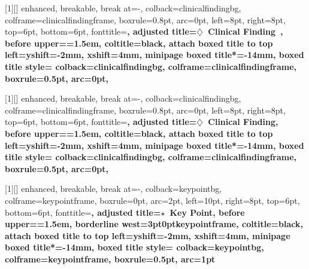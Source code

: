 \newcommand{\clinicalfindingicon}{\ensuremath{\diamondsuit}}

[1][]{%
  enhanced,
  breakable,
  break at=-\baselineskip,
  colback=clinicalfindingbg,
  colframe=clinicalfindingframe,
  boxrule=0.8pt,
  arc=0pt,
  left=8pt,
  right=8pt,
  top=6pt,
  bottom=6pt,
  fonttitle=\bfseries\sffamily,
  adjusted title={\clinicalfindingicon~Clinical Finding~\theclinicalfindingcounter{}},
  before upper={\parindent=1.5em},
  coltitle=black,
  attach boxed title to top left={yshift=-2mm, xshift=4mm},
  minipage boxed title*=-14mm,
  boxed title style={
    colback=clinicalfindingbg,
    colframe=clinicalfindingframe,
    boxrule=0.5pt,
    arc=0pt,
      }
}

[1][]{%
  enhanced,
  breakable,
  break at=-\baselineskip,
  colback=clinicalfindingbg,
  colframe=clinicalfindingframe,
  boxrule=0.8pt,
  arc=0pt,
  left=8pt,
  right=8pt,
  top=6pt,
  bottom=6pt,
  fonttitle=\bfseries\sffamily,
  adjusted title={\clinicalfindingicon~Clinical Finding},
  before upper={\parindent=1.5em},
  coltitle=black,
  attach boxed title to top left={yshift=-2mm, xshift=4mm},
  minipage boxed title*=-14mm,
  boxed title style={
    colback=clinicalfindingbg,
    colframe=clinicalfindingframe,
    boxrule=0.5pt,
    arc=0pt,
      }
}

%

\newcommand{\keypointicon}{\ensuremath{\star}}

[1][]{%
  enhanced,
  breakable,
  break at=-\baselineskip,
  colback=keypointbg,
  colframe=keypointframe,
  boxrule=0pt,
  arc=2pt,
  left=10pt,
  right=8pt,
  top=6pt,
  bottom=6pt,
  fonttitle=\bfseries\sffamily,
  adjusted title={\keypointicon~Key Point},
  before upper={\parindent=1.5em},
  borderline west={3pt}{0pt}{keypointframe},
  coltitle=black,
  attach boxed title to top left={yshift=-2mm, xshift=4mm},
  minipage boxed title*=-14mm,
  boxed title style={
    colback=keypointbg,
    colframe=keypointframe,
    boxrule=0.5pt,
    arc=1pt
  }
}

